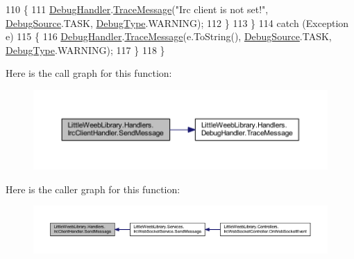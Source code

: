 \begin{DoxyCode}
110                 \{
111                     \mbox{\hyperlink{class_little_weeb_library_1_1_handlers_1_1_irc_client_handler_ab50ece494948d25db1839f4d6eab038f}{DebugHandler}}.\mbox{\hyperlink{interface_little_weeb_library_1_1_handlers_1_1_i_debug_handler_a2e405bc3492e683cd3702fae125221bc}{TraceMessage}}(\textcolor{stringliteral}{"Irc client is not set!"}, 
      \mbox{\hyperlink{namespace_little_weeb_library_1_1_handlers_a2a6ca0775121c9c503d58aa254d292be}{DebugSource}}.TASK, \mbox{\hyperlink{namespace_little_weeb_library_1_1_handlers_ab66019ed40462876ec4e61bb3ccb0a62}{DebugType}}.WARNING);
112                 \}
113             \}
114             \textcolor{keywordflow}{catch} (Exception e)
115             \{
116                 \mbox{\hyperlink{class_little_weeb_library_1_1_handlers_1_1_irc_client_handler_ab50ece494948d25db1839f4d6eab038f}{DebugHandler}}.\mbox{\hyperlink{interface_little_weeb_library_1_1_handlers_1_1_i_debug_handler_a2e405bc3492e683cd3702fae125221bc}{TraceMessage}}(e.ToString(), 
      \mbox{\hyperlink{namespace_little_weeb_library_1_1_handlers_a2a6ca0775121c9c503d58aa254d292be}{DebugSource}}.TASK, \mbox{\hyperlink{namespace_little_weeb_library_1_1_handlers_ab66019ed40462876ec4e61bb3ccb0a62}{DebugType}}.WARNING);
117             \}
118         \}
\end{DoxyCode}
Here is the call graph for this function\+:\nopagebreak
\begin{figure}[H]
\begin{center}
\leavevmode
\includegraphics[width=350pt]{class_little_weeb_library_1_1_handlers_1_1_irc_client_handler_ae28984176dff0eda63604b8e5c25abb4_cgraph}
\end{center}
\end{figure}
Here is the caller graph for this function\+:\nopagebreak
\begin{figure}[H]
\begin{center}
\leavevmode
\includegraphics[width=350pt]{class_little_weeb_library_1_1_handlers_1_1_irc_client_handler_ae28984176dff0eda63604b8e5c25abb4_icgraph}
\end{center}
\end{figure}
\mbox{\label{class_little_weeb_library_1_1_handlers_1_1_irc_client_handler_afa3e3e60cc12d3867d3c6e2a188dca14}} 
